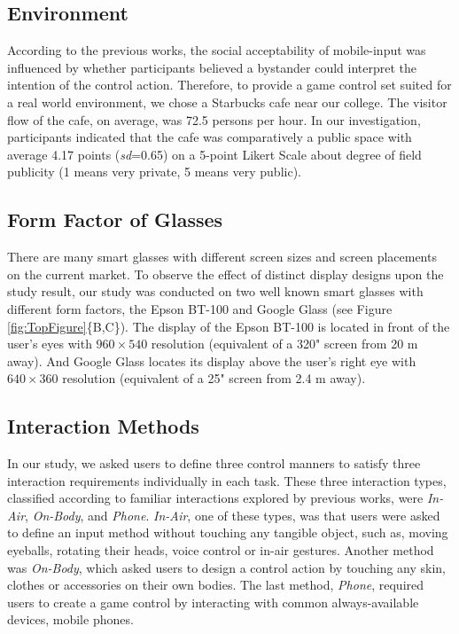 \documentclass{sigchi}
\begin{document}
  \subsection {Environment}
  According to the previous works\cite{Wiliamson:2011:MMI:2070481.2070551,Williamson:2013:MEM:2522848.2522874,Montero:2010:YUS:1851600.1851647,Rico:2010:UGM:1753326.1753458}, the social acceptability of mobile-input was influenced by whether participants believed a bystander could interpret the intention of the control action. Therefore, to provide a game control set suited for a real world environment, we chose a Starbucks cafe near our college. The visitor flow of the cafe, on average, was 72.5 persons per hour. In our investigation, participants indicated that the cafe was comparatively a public space with average 4.17 points (\textsl{sd}=0.65) on a 5-point Likert Scale about degree of field publicity (1 means very private, 5 means very public).    

  \subsection {Form Factor of Glasses}
  There are many smart glasses with different screen sizes and screen placements on the current market. To observe the effect of distinct display designs upon the study result, our study was conducted on two well known smart glasses with different form factors, the Epson BT-100 and Google Glass (see Figure \ref{fig:TopFigure}\{B,C\}). The display of the Epson BT-100 is located in front of the user's eyes with $960 \times 540$ resolution (equivalent of a 320" screen from 20 m away)\cite{BT100}. And Google Glass locates its display above the user's right eye with $640 \times 360$ resolution (equivalent of a 25" screen from 2.4 m away)\cite{GoogleGlass}.       

    \subsection {Interaction Methods}
    In our study, we asked users to define three control manners to satisfy three interaction requirements individually in each task. These three interaction types, classified according to familiar interactions explored by previous works, were \textsl{In-Air}, \textsl{On-Body}, and \textsl{Phone}. \textsl{In-Air}, one of these types, was that users were asked to define an input method without touching any tangible object, such as, moving eyeballs, rotating their heads, voice control or in-air gestures. Another method was \textsl{On-Body}, which asked users to design a control action by touching any skin, clothes or accessories on their own bodies. The last method, \textsl{Phone}, required users to create a game control by interacting with common always-available devices, mobile phones.    
\end{document}
